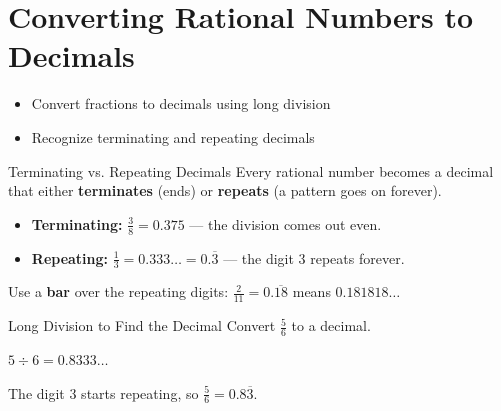 \section{Converting Rational Numbers to Decimals}

\begin{learningGoals}
\begin{itemize}
    \item Convert fractions to decimals using long division
    \item Recognize terminating and repeating decimals
\end{itemize}
\end{learningGoals}

\begin{conceptBox}{Terminating vs. Repeating Decimals}
Every rational number becomes a decimal that either \textbf{terminates} (ends) or \textbf{repeats} (a pattern goes on forever).
\begin{itemize}[leftmargin=*]
    \item \textbf{Terminating:} $\frac{3}{8} = 0.375$ — the division comes out even.
    \item \textbf{Repeating:} $\frac{1}{3} = 0.333\ldots = 0.\overline{3}$ — the digit $3$ repeats forever.
\end{itemize}
Use a \textbf{bar} over the repeating digits: $\frac{2}{11} = 0.\overline{18}$ means $0.181818\ldots$
\end{conceptBox}

\begin{workedExample}{Long Division to Find the Decimal}
Convert $\frac{5}{6}$ to a decimal.

$5 \div 6 = 0.8333\ldots$

The digit $3$ starts repeating, so $\frac{5}{6} = 0.8\overline{3}$.
\end{workedExample}


